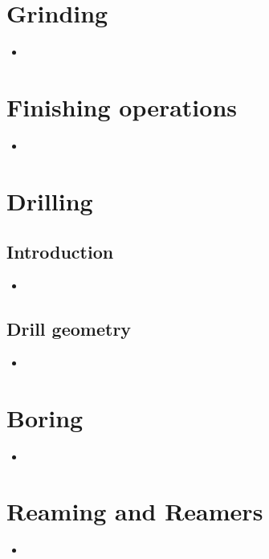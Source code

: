 \documentclass[8pt]{report}
\begin{document}
\chapter{Grinding}
	\begin{itemize}
		\item
	\end{itemize}\hrulefill
\chapter{Finishing operations}
	\begin{itemize}
		\item
	\end{itemize}\hrulefill
\chapter{Drilling}
\section{Introduction}
	\begin{itemize}
		\item
	\end{itemize}\hrulefill
\section{Drill geometry}
	\begin{itemize}
		\item
	\end{itemize}\hrulefill
\chapter{Boring}
	\begin{itemize}
		\item
	\end{itemize}\hrulefill
\chapter{Reaming and Reamers}
	\begin{itemize}
		\item
	\end{itemize}\hrulefill
\end{document}
